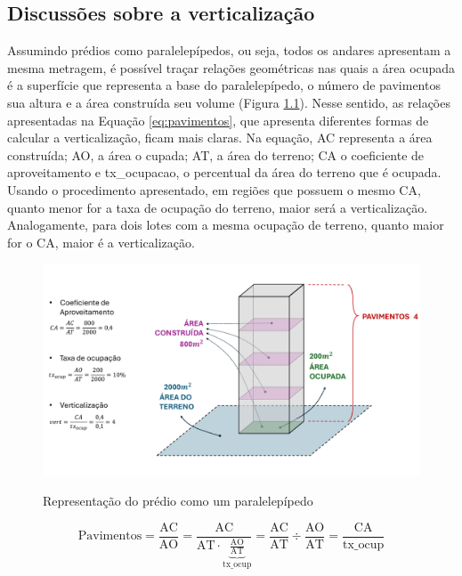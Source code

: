 \begin{apendicesenv}

\partapendices

\chapter{Discussões sobre a verticalização}
\label{appendix:verticalizacao}

Assumindo prédios como paralelepípedos, ou seja, todos os andares apresentam a mesma metragem, é possível traçar relações geométricas nas quais a área ocupada é a superfície que representa a base do paralelepípedo, o número de pavimentos sua altura e a área construída seu volume (Figura \ref{fig:desenho}). Nesse sentido, as relações apresentadas na Equação \ref{eq:pavimentos}, que apresenta diferentes formas de calcular a verticalização, ficam mais claras. Na equação, AC representa a área construída; AO, a área o cupada; AT, a área do terreno; CA o coeficiente de aproveitamento e tx\_ocupacao, o percentual da área do terreno que é ocupada. Usando o procedimento apresentado, em regiões que possuem o mesmo CA, quanto menor for a taxa de ocupação do terreno, maior será a verticalização. Analogamente, para dois lotes com a mesma ocupação de terreno, quanto maior for o CA, maior é a verticalização.

\begin{figure}[h]
    \centering
    \caption{Representação do prédio como um paralelepípedo}
    \includegraphics[width = \linewidth]{figuras/desenho.pdf}
    \label{fig:desenho}
\end{figure}

\begin{equation}
    \text{Pavimentos}=\frac{\text{AC}}{\text{AO}}=\frac{\text{AC}}{\text{AT}\cdot\underbrace{\frac{\text{AO}}{\text{AT}}}_\text{tx\_ocup}}=\frac{\text{AC}}{\text{AT}}\div\frac{\text{AO}}{\text{AT}}=\frac{\text{CA}}{\text{tx\_ocup}}
    \label{eq:pavimentos}
\end{equation}
    

\end{apendicesenv}
